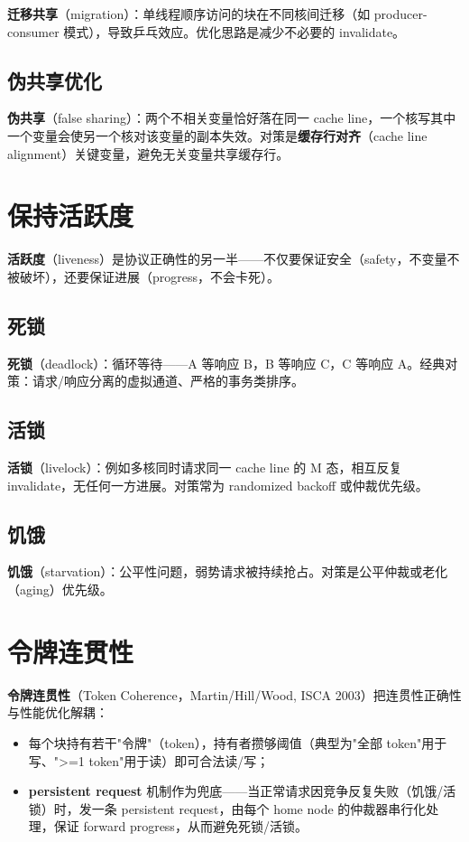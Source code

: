 \textbf{迁移共享}（migration）：单线程顺序访问的块在不同核间迁移（如 producer-consumer 模式），导致乒乓效应。优化思路是减少不必要的 invalidate。

\subsection{伪共享优化}

\textbf{伪共享}（false sharing）：两个不相关变量恰好落在同一 cache line，一个核写其中一个变量会使另一个核对该变量的副本失效。对策是\textbf{缓存行对齐}（cache line alignment）关键变量，避免无关变量共享缓存行。

\section{保持活跃度}

\textbf{活跃度}（liveness）是协议正确性的另一半——不仅要保证安全（safety，不变量不被破坏），还要保证进展（progress，不会卡死）。

\subsection{死锁}

\textbf{死锁}（deadlock）：循环等待——A 等响应 B，B 等响应 C，C 等响应 A。经典对策：请求/响应分离的虚拟通道、严格的事务类排序。

\subsection{活锁}

\textbf{活锁}（livelock）：例如多核同时请求同一 cache line 的 M 态，相互反复 invalidate，无任何一方进展。对策常为 randomized backoff 或仲裁优先级。

\subsection{饥饿}

\textbf{饥饿}（starvation）：公平性问题，弱势请求被持续抢占。对策是公平仲裁或老化（aging）优先级。

\section{令牌连贯性}

\textbf{令牌连贯性}（Token Coherence，Martin/Hill/Wood, ISCA 2003）把连贯性正确性与性能优化解耦：

\begin{itemize}
\item 每个块持有若干"令牌"（token），持有者攒够阈值（典型为"全部 token"用于写、">=1 token"用于读）即可合法读/写；
\item \textbf{persistent request} 机制作为兜底——当正常请求因竞争反复失败（饥饿/活锁）时，发一条 persistent request，由每个 home node 的仲裁器串行化处理，保证 forward progress，从而避免死锁/活锁。
\end{itemize}


